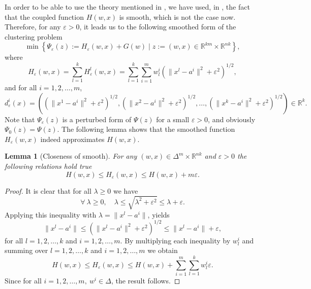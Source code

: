 \documentclass[12pt]{article}
\numberwithin{equation}{section}
\newtheorem{lemma}{Lemma}[proposition]
\begin{document}
In order to be able to use the theory mentioned in , we have used, in , the fact that the coupled function $H(w,x)$ is smooth, which is not the case now. Therefore, for any $\varepsilon > 0$, it leads us to the following smoothed form of the clustering problem
\begin{equation}
	\min \left\lbrace \Psi_{\varepsilon}(z) := H_{\varepsilon}(w,x) + G(w) \mid z := (w,x) \in \mathbb{R}^{km} \times \mathbb{R}^{nk} \right\rbrace , \label{StateEq31}
\end{equation}
where 
\begin{equation}
	H_{\varepsilon}(w,x) = \sum\limits_{l=1}^{k} H^l_{\varepsilon}(w,x)
	= \sum\limits_{l=1}^{k} \sum\limits_{i=1}^{m} w^i_l \left( \| x^l - a^i \|^2 + {\varepsilon}^2 \right)^{1/2} , \label{StateEq34}
\end{equation}
and for all $i=1,2, \ldots, m$,
\begin{equation}
	d_{\varepsilon}^i(x) = \left( \left( \|x^1 - a^i\|^2 + {\varepsilon}^2 \right)^{1/2}, \left( \|x^2 - a^i\|^2 + {\varepsilon}^2 \right)^{1/2}, \ldots , \left( \|x^k - a^i\|^2 + {\varepsilon}^2 \right)^{1/2} \right) \in \mathbb{R}^k . \label{StateEq35}
\end{equation}
Note that $\Psi_{\varepsilon}(z)$ is a perturbed form of $\Psi(z)$ for a small $\varepsilon > 0$, and obviously $\Psi_0(z)=\Psi(z)$. The following lemma shows that the smoothed function $H_{\varepsilon}(w,x)$ indeed approximates $H(w,x)$.

\begin{lemma}[Closeness of smooth]
For any $(w,x) \in {\Delta}^m \times \mathbb{R}^{nk}$ and $\varepsilon > 0$ the following relations hold true
\begin{equation*}
	H(w,x) \leq H_{\varepsilon}(w,x) \leq H(w,x) + m\varepsilon .
\end{equation*}
\end{lemma}

\begin{proof}
It is clear that for all $\lambda \geq 0$ we have
\begin{equation*}
	\forall \: \lambda \geq 0, \quad \lambda \leq \sqrt{\lambda^2 + \varepsilon^2} \leq \lambda + \varepsilon .
\end{equation*}
Applying this inequality with $\lambda = \|x^l - a^i \|$, yields
\begin{equation*}
	\|x^l - a^i \| \leq \left(\|x^l - a^i \|^2 + {\varepsilon}^2 \right)^{1/2} \leq \|x^l - a^i \| + \varepsilon ,
\end{equation*}
for all $l=1,2, \ldots, k$ and $i=1,2, \ldots, m$.
By multiplying each inequality by $w^i_l$ and summing over $l=1,2, \ldots, k$ and $i=1,2, \ldots, m$ we obtain
\begin{equation*}
	H(w,x) \leq H_{\varepsilon}(w,x) \leq H(w,x) + \sum\limits_{i=1}^m \sum\limits_{l=1}^k w^i_l \varepsilon .
\end{equation*}
Since for all $i=1,2, \dots, m, \: w^i \in \Delta$, the result follows.
\end{proof}
\end{document}
